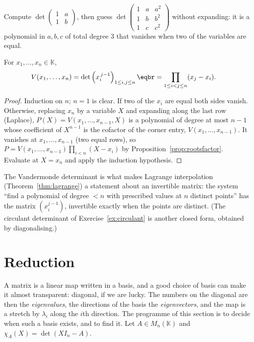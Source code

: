 \begin{think}
Compute $\det\begin{pmatrix}1&a\\1&b\end{pmatrix}$, then guess $\det\begin{pmatrix}1&a&a^2\\1&b&b^2\\1&c&c^2\end{pmatrix}$ without expanding: it is a polynomial in $a,b,c$ of total degree $3$ that vanishes when two of the variables are equal.
\end{think}

\begin{proposition}[Vandermonde]\label{prop:vdm}
For $x_1,\dots,x_n\in\mathbb K$,
\[
\begin{aligned}V(x_1,\dots,x_n)&=\det\left(x_i^{\,j-1}\right)_{1\le i,j\le n}\eqbr=\prod_{1\le i<j\le n}(x_j-x_i).\end{aligned}
\]
\end{proposition}
\begin{proof}
Induction on $n$; $n=1$ is clear. If two of the $x_i$ are equal both sides vanish. Otherwise, replacing $x_n$ by a variable $X$ and expanding along the last row (Laplace),
$P(X)=V(x_1,\dots,x_{n-1},X)$ is a polynomial of degree at most $n-1$ whose coefficient of $X^{n-1}$ is the cofactor of the corner entry, $V(x_1,\dots,x_{n-1})$. It vanishes at $x_1,\dots,x_{n-1}$ (two equal rows),
so $P=V(x_1,\dots,x_{n-1})\prod_{i<n}(X-x_i)$ by Proposition~\ref{prop:rootsfactor}. Evaluate at $X=x_n$ and apply the induction hypothesis.
\end{proof}

The Vandermonde determinant is what makes Lagrange interpolation (Theorem~\ref{thm:lagrange}) a statement about an invertible matrix: the system ``find a polynomial of degree $<n$ with prescribed values at $n$ distinct points'' has the matrix $(x_i^{j-1})$, invertible exactly when the points are distinct. (The circulant determinant of Exercise~\ref{ex:circulant} is another closed form, obtained by diagonalising.)

\section{Reduction}

A matrix is a linear map written in a basis, and a good choice of basis can make it almost transparent: diagonal, if we are lucky. The numbers on the
diagonal are then the \emph{eigenvalues}, the directions of the basis the \emph{eigenvectors}, and the map is a stretch by $\lambda_i$ along the
$i$th direction. The programme of this section is to decide when such a basis exists, and to find it. Let $A\in M_n(\mathbb K)$ and $\chi_A(X)=\det(XI_n-A)$.

